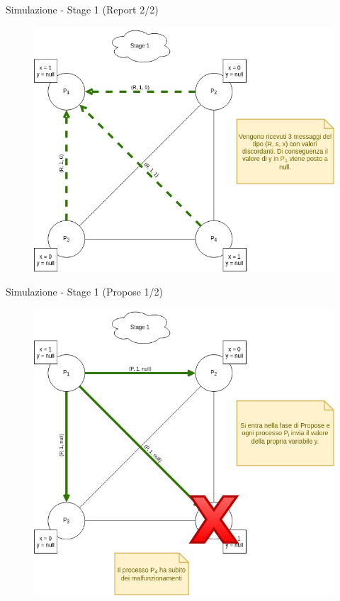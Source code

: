 \documentclass{beamer}
\begin{document}
\begin{frame}{Simulazione - Stage 1 (Report 2/2)}
\begin{figure}
    \centering
    \includegraphics[scale=0.35]{simulazione/simulazione4.png}
\end{figure}
\end{frame}

\begin{frame}{Simulazione - Stage 1 (Propose 1/2)}
\begin{figure}
    \centering
    \includegraphics[scale=0.35]{simulazione/simulazione5.png}
\end{figure}
\end{frame}
\end{document}
